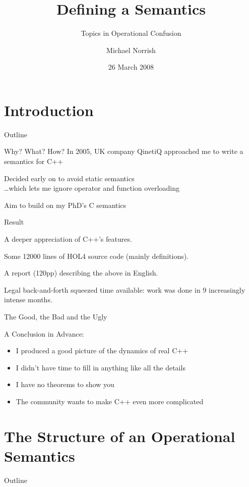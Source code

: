 \documentclass[compress,dvips,color=usenames,xcolor=dvipsnames]{beamer}
\title{Defining a \cpp{} Semantics}
\subtitle{Topics in Operational Confusion}
\author{Michael Norrish}
\institute[NICTA]{Canberra Research Lab., NICTA}
\date{26 March 2008}
\newcommand{\cpp}{\mbox{C\hspace{-.1em}+\hspace{-.05em}+}}
\begin{document}
\frame{\titlepage}
\section{Introduction}
\begin{frame}{Outline}\tableofcontents\end{frame}

\begin{frame}{Why? What? How?}
In 2005, UK company QinetiQ approached me to write a semantics
  for \cpp{}

\bigskip
Decided early on to avoid static semantics\\[1mm]
  \quad\quad\dots {\footnotesize which lets me ignore operator and function overloading}

\bigskip
Aim to build on my PhD's C semantics
\end{frame}

\begin{frame}{Result}

A deeper appreciation of \cpp's features.

\bigskip
Some 12\hspace{.1em}000 lines of HOL4 source code (mainly definitions).

\bigskip
A report (120pp) describing the above in English.

\bigskip
Legal back-and-forth squeezed time available: work was done in 9
increasingly intense months.

\end{frame}

\begin{frame}{The Good, the Bad and the Ugly}

A Conclusion in Advance:
\begin{itemize}
\item I produced a good picture of the dynamics of real \cpp
\item I didn't have time to fill in anything like all the details
\item I have no theorems to show you
\item The community wants to make \cpp{} even more complicated
\end{itemize}

\end{frame}

\section{The Structure of an Operational Semantics}
\begin{frame}{Outline}\tableofcontents[current]\end{frame}
\end{document}
